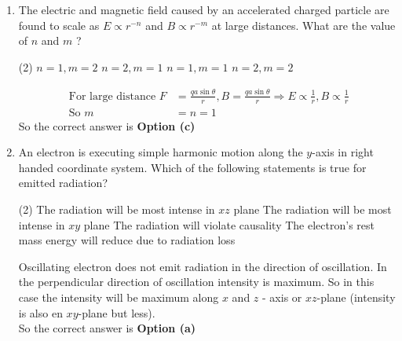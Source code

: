\begin{enumerate}
	{}
	\begin{tasks}(2)
		\task[\textbf{a.}]$\frac{\partial \lambda}{\partial t}$
		\task[\textbf{b.}]$-\frac{\partial \lambda}{\partial t}$
		\task[\textbf{c.}] $\frac{1}{2} \frac{\partial \lambda}{\partial t}$
		\task[\textbf{d.}]  $-\frac{1}{2} \frac{\partial \lambda}{\partial t}$
	\end{tasks}
\begin{answer}
	\begin{align*}
	\intertext{Consider Gauge Transformation}
	\vec{A}^{\prime}=\vec{A}-\vec{\nabla} \lambda=\vec{A}+\vec{\nabla}(-\lambda) \quad \text { and } \quad \Phi^{\prime}=\Phi-\frac{\partial(-\lambda)}{\partial t}=\Phi+\frac{\partial \lambda}{\partial t}
	\end{align*}
		So the correct answer is \textbf{Option (a)}
\end{answer}
	\item  The electric and magnetic field caused by an accelerated charged particle are found to scale as $E \propto r^{-n}$ and $B \propto r^{-m}$ at large distances. What are the value of $n$ and $m$ ?
	{}
	\begin{tasks}(2)
		\task[\textbf{a.}]$n=1, m=2$
		\task[\textbf{b.}]$n=2, m=1$
		\task[\textbf{c.}]$n=1, m=1$
		\task[\textbf{d.}]$n=2, m=2$
	\end{tasks}
\begin{answer}
	\begin{align*}
	\text { For large distance } F&=\frac{q a \sin \theta}{r}, B=\frac{q a \sin \theta}{r} \Rightarrow E \propto \frac{1}{r}, B \propto \frac{1}{r}\\
	\text { So } m&=n=1
	\end{align*}
		So the correct answer is \textbf{Option (c)}
\end{answer}
	\item  An electron is executing simple harmonic motion along the $y$-axis in right handed coordinate system. Which of the following statements is true for emitted radiation?
	{}
	\begin{tasks}(2)
		\task[\textbf{a.}]The radiation will be most intense in $x z$ plane
		\task[\textbf{b.}] The radiation will be most intense in $x y$ plane
		\task[\textbf{c.}]The radiation will violate causality
		\task[\textbf{d.}] The electron's rest mass energy will reduce due to radiation loss
	\end{tasks}
\begin{answer}
Oscillating electron does not emit radiation in the direction of oscillation.
In the perpendicular direction of oscillation intensity is maximum.
So in this case the intensity will be maximum along $x$ and $z$ - axis or $x z$-plane (intensity is also en $x y$-plane but less).\\
	So the correct answer is \textbf{Option (a)}
\end{answer}
\end{enumerate}